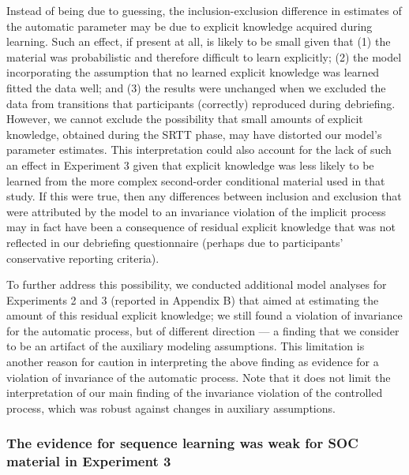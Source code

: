 \documentclass[jou]{apa6}
\theoremstyle{definition}
\theoremstyle{definition}
\theoremstyle{definition}
\theoremstyle{remark}
\begin{document}
Instead of being due to guessing, the inclusion-exclusion difference in
estimates of the automatic parameter may be due to explicit knowledge
acquired during learning. Such an effect, if present at all, is likely
to be small given that (1) the material was probabilistic and therefore
difficult to learn explicitly; (2) the model incorporating the
assumption that no learned explicit knowledge was learned fitted the
data well; and (3) the results were unchanged when we excluded the data
from transitions that participants (correctly) reproduced during
debriefing. However, we cannot exclude the possibility that small
amounts of explicit knowledge, obtained during the SRTT phase, may have
distorted our model's parameter estimates. This interpretation could
also account for the lack of such an effect in Experiment 3 given that
explicit knowledge was less likely to be learned from the more complex
second-order conditional material used in that study. If this were true,
then any differences between inclusion and exclusion that were
attributed by the model to an invariance violation of the implicit
process may in fact have been a consequence of residual explicit
knowledge that was not reflected in our debriefing questionnaire
(perhaps due to participants' conservative reporting criteria).

To further address this possibility, we conducted additional model
analyses for Experiments 2 and 3 (reported in Appendix B) that aimed at
estimating the amount of this residual explicit knowledge; we still
found a violation of invariance for the automatic process, but of
different direction --- a finding that we consider to be an artifact of
the auxiliary modeling assumptions. This limitation is another reason
for caution in interpreting the above finding as evidence for a
violation of invariance of the automatic process. Note that it does not
limit the interpretation of our main finding of the invariance violation
of the controlled process, which was robust against changes in auxiliary
assumptions.

\subsubsection{The evidence for sequence learning was weak for SOC
material in Experiment
3}\label{the-evidence-for-sequence-learning-was-weak-for-soc-material-in-experiment-3}
\end{document}
